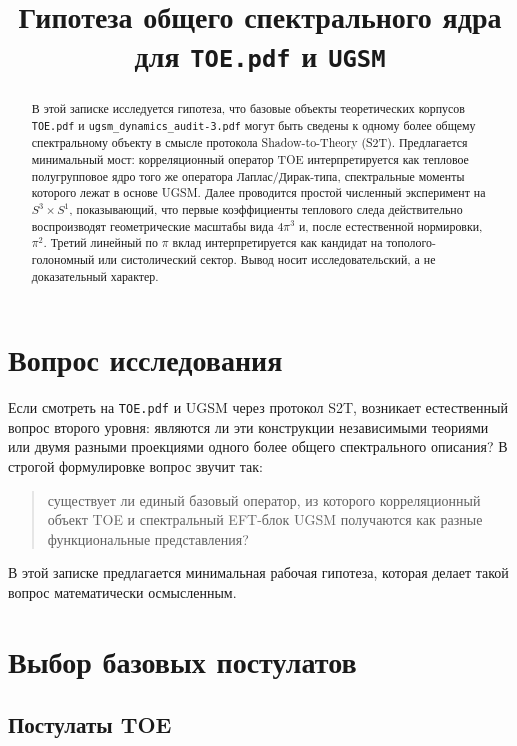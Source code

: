 \documentclass[12pt,a4paper]{article}
\title{Гипотеза общего спектрального ядра для \texttt{TOE.pdf} и \texttt{UGSM}}
\author{}
\date{}
\begin{document}
\maketitle

\begin{abstract}
В этой записке исследуется гипотеза, что базовые объекты теоретических корпусов \texttt{TOE.pdf} и \texttt{ugsm\_dynamics\_audit-3.pdf} могут быть сведены к одному более общему спектральному объекту в смысле протокола Shadow-to-Theory (S2T). Предлагается минимальный мост: корреляционный оператор TOE интерпретируется как тепловое полугрупповое ядро того же оператора Лаплас/Дирак-типа, спектральные моменты которого лежат в основе UGSM. Далее проводится простой численный эксперимент на \(S^3 \times S^1\), показывающий, что первые коэффициенты теплового следа действительно воспроизводят геометрические масштабы вида \(4\pi^3\) и, после естественной нормировки, \(\pi^2\). Третий линейный по \(\pi\) вклад интерпретируется как кандидат на тополого-голономный или систолический сектор. Вывод носит исследовательский, а не доказательный характер.
\end{abstract}

\section{Вопрос исследования}

Если смотреть на \texttt{TOE.pdf} и UGSM через протокол S2T, возникает естественный вопрос второго уровня: являются ли эти конструкции независимыми теориями или двумя разными проекциями одного более общего спектрального описания? В строгой формулировке вопрос звучит так:
\begin{quote}
существует ли единый базовый оператор, из которого корреляционный объект TOE и спектральный EFT-блок UGSM получаются как разные функциональные представления?
\end{quote}

В этой записке предлагается минимальная рабочая гипотеза, которая делает такой вопрос математически осмысленным.

\section{Выбор базовых постулатов}

\subsection{Постулаты TOE}
\end{document}
